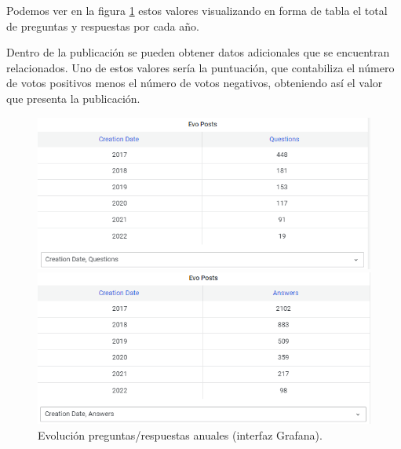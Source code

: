 \documentclass[a4paper, 12pt]{book}
\begin{document}
Podemos ver en la figura \ref{fig:Pq_an} estos valores visualizando en forma de tabla el total de preguntas y respuestas por cada año.

Dentro de la publicación se pueden obtener datos adicionales que se encuentran relacionados. Uno de estos valores sería la puntuación, que contabiliza el número de votos positivos menos el número de votos negativos, obteniendo así el valor que presenta la publicación. 

\begin{figure}
    \begin{minipage}[b]{0.45\linewidth}
        \centering
        \includegraphics[width=\textwidth]{img/cse/evo_posts_questions.png}
        \end{minipage}
    \hspace{0.5cm}
    \begin{minipage}[b]{0.45\linewidth}
        \centering
        \includegraphics[width=\textwidth]{img/cse/evo_posts_answers.png}
    \end{minipage}
    \caption{Evolución preguntas/respuestas anuales (interfaz Grafana).}
    \label{fig:Pq_an}
\end{figure}
\end{document}
